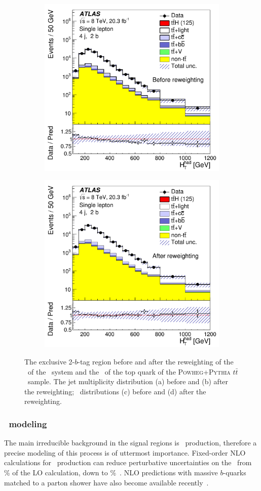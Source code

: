 \begin{figure}[!tp]
\begin{center}
\begin{subfigure}{0.49\textwidth}{\includegraphics[width=\textwidth]{Modeling/Figures/fig_05c.pdf}}
    \caption{}\end{subfigure}
  \begin{subfigure}{0.49\textwidth}{\includegraphics[width=\textwidth]{Modeling/Figures/fig_05d.pdf}}\label{fig:ttbarseqrw_d}
    \caption{}\end{subfigure}
\caption{The exclusive 2-$b$-tag region before and after the reweighting of the \pt\ of the \ttbar\ system and the \pt\ of the top quark of the \textsc{Powheg+Pythia} $t\bar{t}$\ sample.
The jet multiplicity distribution (a) before and (b) after the reweighting;  
\hthad\ distributions (c) before and (d) after the reweighting. }
\label{fig:ttbarseqrw}
\end{center}
\end{figure}


\subsubsection{\texorpdfstring{\ttbb\ modeling}{ttbb modeling}}
\label{subsec:ttbb}
The main irreducible background in the signal regions is \ttbb\ production, therefore a precise modeling of this process is of uttermost importance. 
Fixed-order NLO calculations for \ttbb\ production can reduce perturbative
uncertainties on the \xsec\ from \unit[70-80]{\%} of the LO calculation, down to \unit[15-20]{\%}~\cite{Bredenstein:2009aj,Bredenstein:2010rs,Bevilacqua:2009zn}. 
NLO predictions with massive $b$-quarks matched to a parton shower have also become available recently~\cite{Cascioli:2013era}.

